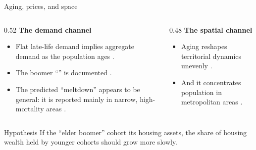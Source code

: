 \documentclass[aspectratio=169]{beamer}
\begin{document}
\begin{frame}{Aging, prices, and space}
    \begin{columns}[T]
        \begin{column}{0.52\textwidth}
            \textbf{The demand channel}
            \begin{itemize}
                \item Flat late-life demand implies aggregate demand
                       as the population ages
                      \citep{Eichholtz2014_demographics_demand}.
                \item The boomer ``'' is documented
                      \citep{Mankiw1989_baby_boom_bust, Takats2012_aging_house_prices}.
                \item The predicted ``meltdown'' appears  to be
                      general: it is reported mainly in narrow, high-mortality
                      areas
                      \citep{Dabrowski2019_demography_price_prognosis, Simon2017_concurrence_generationnelle}.
            \end{itemize}
        \end{column}
        \begin{column}{0.48\textwidth}
            \textbf{The spatial channel}
            \begin{itemize}
                \item Aging reshapes territorial dynamics unevenly
                      \citep{EssafiZouari2021_local_housing_wealth}.
                \item And it concentrates population in metropolitan areas
                      \citep{GrafenederWeissteiner2013_agglomeration_demographic, Takahashi2022_aging_economic_geography}.
            \end{itemize}
        \end{column}
    \end{columns}

    \vspace{0.3em}
    \begin{block}{Hypothesis }
        If the ``elder boomer'' cohort  its housing assets, the
        share of housing wealth held by younger cohorts should grow more slowly.
    \end{block}
\end{frame}

\end{document}
